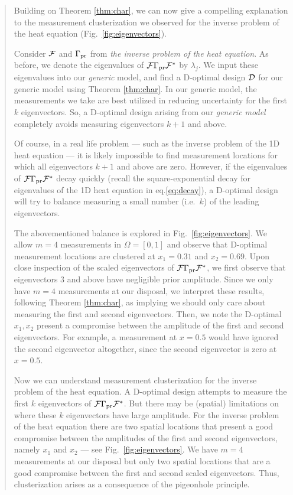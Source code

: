 \begin{quote}
  Building on Theorem \ref{thm:char}, we can now give a compelling
  explanation to the measurement clusterization we observed for the
  inverse problem of the heat equation (Fig.~\ref{fig:eigenvectors}).
    
  Consider $\mathcal{F}$ and $\Gamma_{\textup{pr}}$ from \emph{the inverse problem of the
  heat equation}. As before, we denote the eigenvalues of
  $\mathcal{F}\Gamma_{\textup{pr}}\mathcal{F}^*$ by $\lambda_j$. We input these eigenvalues into
  our \emph{generic} model, and find a D-optimal design $\mathcal{D}$ for our
  generic model using Theorem \ref{thm:char}. In our generic model,
  the measurements we take are best utilized in reducing uncertainty
  for the first $k$ eigenvectors. So, a D-optimal design arising from
  our \emph{generic model} completely avoids measuring eigenvectors
  $k+1$ and above.

  Of course, in a real life problem --- such as the inverse problem of
  the 1D heat equation --- it is likely impossible to find measurement
  locations for which all eigenvectors $k+1$ and above are
  zero. However, if the eigenvalues of $\mathcal{F}\Gamma_{\textup{pr}}\mathcal{F}^*$ decay
  quickly (recall the square-exponential decay for eigenvalues of the
  1D heat equation in eq.\eqref{eq:decay}), a D-optimal design will
  try to balance measuring a small number (i.e.~$k$) of the leading
  eigenvectors.

  The abovementioned balance is explored in
  Fig.~\ref{fig:eigenvectors}. We allow $m=4$ measurements in $\Omega
  = [0,1]$ and observe that D-optimal measurement locations are
  clustered at $x_1 = 0.31$ and $x_2 = 0.69$. Upon close inspection of
  the scaled eigenvectors of $\mathcal{F} \Gamma_{\textup{pr}} \mathcal{F}^*$, we first observe
  that eigenvectors $3$ and above have negligible prior
  amplitude. Since we only have $m=4$ measurements at our disposal, we
  interpret these results, following Theorem \ref{thm:char}, as
  implying we should only care about measuring the first and second
  eigenvectors. Then, we note the D-optimal $x_1,x_2$ present a
  compromise between the amplitude of the first and second
  eigenvectors. For example, a measurement at $x=0.5$ would have
  ignored the second eigenvector altogether, since the second
  eigenvector is zero at $x=0.5$.

  Now we can understand measurement clusterization for the inverse
  problem of the heat equation. A D-optimal design attempts to measure
  the first $k$ eigenvectors of $\mathcal{F} \Gamma_{\textup{pr}} \mathcal{F}^*$. But there may be
  (spatial) limitations on where these $k$ eigenvectors have large
  amplitude. For the inverse problem of the heat equation there are
  two spatial locations that present a good compromise between the
  amplitudes of the first and second eigenvectors, namely $x_1$ and
  $x_2$ --- see Fig.~\ref{fig:eigenvectors}. We have $m=4$
  measurements at our disposal but only two spatial locations that are
  a good compromise between the first and second scaled
  eigenvectors. Thus, clusterization arises as a consequence of the
  pigeonhole principle.

\end{quote}

